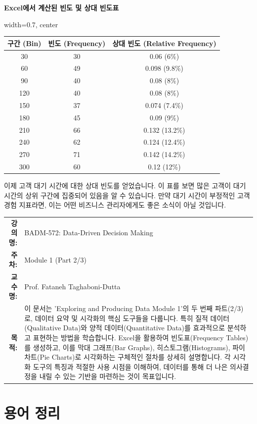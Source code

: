\documentclass[11pt,a4paper]{book}
\makeatletter
\providecommand{\captionof}[2]{\textbf{#2}}
\theoremstyle{definition}
\newcommand{\metainfo}[4]{
\begin{tcolorbox}[
    colback=lightpurple,
    colframe=darkpurple,
    boxrule=1pt,
    arc=2mm,
    left=10pt,
    right=10pt,
    top=8pt,
    bottom=8pt
]
\begin{tabular}{@{}rl@{}}
\textbf{강의명:} & #1 \\[0.3em]
\textbf{주차:} & #2 \\[0.3em]
\textbf{교수명:} & #3 \\[0.3em]
\textbf{목적:} & \begin{minipage}[t]{0.75\textwidth}#4\end{minipage}
\end{tabular}
\end{tcolorbox}
}
\makeatother
\begin{document}
\begin{tcolorbox}[title={상대 빈도 계산 (Calculating Relative Frequency)}]
\begin{center}
\captionof{table}{Excel에서 계산된 빈도 및 상대 빈도표}
\label{tab:excel_frequency_relative_frequency_results}
\begin{adjustbox}{width=0.7\textwidth, center}
\begin{tabular}{ccc}
\toprule
\textbf{구간 (Bin)} & \textbf{빈도 (Frequency)} & \textbf{상대 빈도 (Relative Frequency)} \\
\midrule
30 & 30 & 0.06 (6\%) \\
60 & 49 & 0.098 (9.8\%) \\
90 & 40 & 0.08 (8\%) \\
120 & 40 & 0.08 (8\%) \\
150 & 37 & 0.074 (7.4\%) \\
180 & 45 & 0.09 (9\%) \\
210 & 66 & 0.132 (13.2\%) \\
240 & 62 & 0.124 (12.4\%) \\
270 & 71 & 0.142 (14.2\%) \\
300 & 60 & 0.12 (12\%) \\
\bottomrule
\end{tabular}
\end{adjustbox}
\end{center}
이제 고객 대기 시간에 대한 상대 빈도를 얻었습니다. 이 표를 보면 많은 고객이 대기 시간의 상위 구간에 집중되어 있음을 알 수 있습니다. 만약 대기 시간이 부정적인 고객 경험 지표라면, 이는 어떤 비즈니스 관리자에게도 좋은 소식이 아닐 것입니다.
\end{tcolorbox}


\metainfo{BADM-572: Data-Driven Decision Making}{Module 1 (Part 2/3)}{Prof. Fataneh Taghaboni-Dutta}{이 문서는 'Exploring and Producing Data Module 1'의 두 번째 파트(2/3)로, 데이터 요약 및 시각화의 핵심 도구들을 다룹니다. 특히 질적 데이터(Qualitative Data)와 양적 데이터(Quantitative Data)를 효과적으로 분석하고 표현하는 방법을 학습합니다. Excel을 활용하여 빈도표(Frequency Tables)를 생성하고, 이를 막대 그래프(Bar Graphs), 히스토그램(Histograms), 파이 차트(Pie Charts)로 시각화하는 구체적인 절차를 상세히 설명합니다. 각 시각화 도구의 특징과 적절한 사용 시점을 이해하여, 데이터를 통해 더 나은 의사결정을 내릴 수 있는 기반을 마련하는 것이 목표입니다.}


\section{용어 정리}
\end{document}
